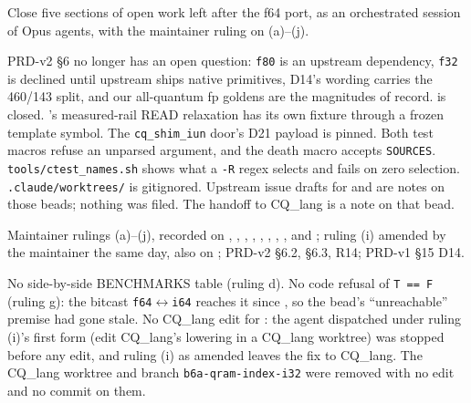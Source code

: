 Close five sections of open work left after the f64 port, as an orchestrated
session of Opus agents, with the maintainer ruling on (a)--(j).

PRD-v2 \S6 no longer has an open question: \texttt{f80} is an upstream
dependency, \texttt{f32} is declined until upstream ships native primitives,
D14's wording carries the 460/143 split, and our all-quantum fp goldens are the
magnitudes of record.   is closed.  's measured-rail READ
relaxation has its own fixture through a frozen template symbol.  The
\texttt{cq\_shim\_iun} door's D21 payload is pinned.  Both test macros refuse
an unparsed argument, and the death macro accepts \texttt{SOURCES}.
\texttt{tools/ctest\_names.sh} shows what a \texttt{-R} regex selects and fails
on zero selection.  \texttt{.claude/worktrees/} is gitignored.  Upstream issue
drafts for  and  are notes on those beads; nothing
was filed.  The  handoff to CQ\_lang is a note on that bead.

\begin{figures}
\end{figures}

Maintainer rulings (a)--(j), recorded on , , ,
, , , , ,  and
; ruling (i) amended by the maintainer the same day, also on
; PRD-v2 \S6.2, \S6.3, R14; PRD-v1 \S15 D14.

No side-by-side BENCHMARKS table (ruling d).  No code refusal of \texttt{T ==
F} (ruling g): the bitcast \texttt{f64}$\leftrightarrow$\texttt{i64} reaches
it since , so the bead's ``unreachable'' premise had gone stale.
No CQ\_lang edit for : the agent dispatched under ruling (i)'s
first form (edit CQ\_lang's lowering in a CQ\_lang worktree) was stopped
before any edit, and ruling (i) as amended leaves the fix to CQ\_lang.  The
CQ\_lang worktree and branch \texttt{b6a-qram-index-i32} were removed with no
edit and no commit on them.


